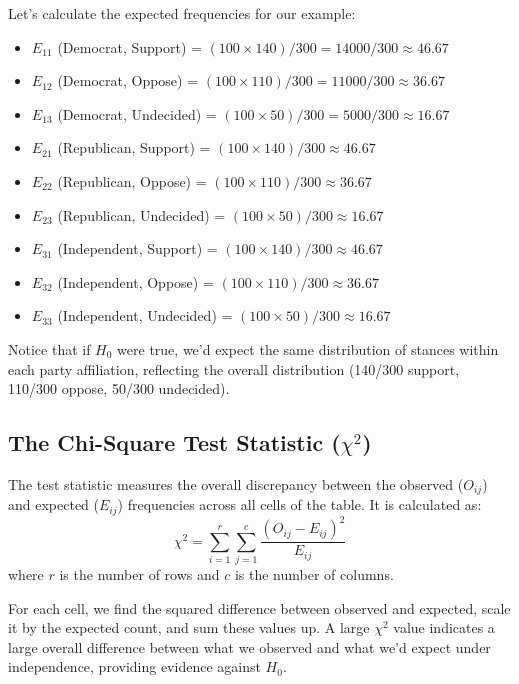 \documentclass{article}
\begin{document}
Let's calculate the expected frequencies for our example:
\begin{itemize}
    \item $E_{11}$ (Democrat, Support) = $(100 \times 140) / 300 = 14000 / 300 \approx 46.67$
    \item $E_{12}$ (Democrat, Oppose) = $(100 \times 110) / 300 = 11000 / 300 \approx 36.67$
    \item $E_{13}$ (Democrat, Undecided) = $(100 \times 50) / 300 = 5000 / 300 \approx 16.67$
    \item $E_{21}$ (Republican, Support) = $(100 \times 140) / 300 \approx 46.67$
    \item $E_{22}$ (Republican, Oppose) = $(100 \times 110) / 300 \approx 36.67$
    \item $E_{23}$ (Republican, Undecided) = $(100 \times 50) / 300 \approx 16.67$
    \item $E_{31}$ (Independent, Support) = $(100 \times 140) / 300 \approx 46.67$
    \item $E_{32}$ (Independent, Oppose) = $(100 \times 110) / 300 \approx 36.67$
    \item $E_{33}$ (Independent, Undecided) = $(100 \times 50) / 300 \approx 16.67$
\end{itemize}
Notice that if $H_0$ were true, we'd expect the same distribution of stances within each party affiliation, reflecting the overall distribution (140/300 support, 110/300 oppose, 50/300 undecided).

\subsection{The Chi-Square Test Statistic ($\chi^2$)}
The test statistic measures the overall discrepancy between the observed ($O_{ij}$) and expected ($E_{ij}$) frequencies across all cells of the table. It is calculated as:
$$ \chi^2 = \sum_{i=1}^{r} \sum_{j=1}^{c} \frac{(O_{ij} - E_{ij})^2}{E_{ij}} $$
where $r$ is the number of rows and $c$ is the number of columns.

For each cell, we find the squared difference between observed and expected, scale it by the expected count, and sum these values up. A large $\chi^2$ value indicates a large overall difference between what we observed and what we'd expect under independence, providing evidence against $H_0$.
\end{document}
